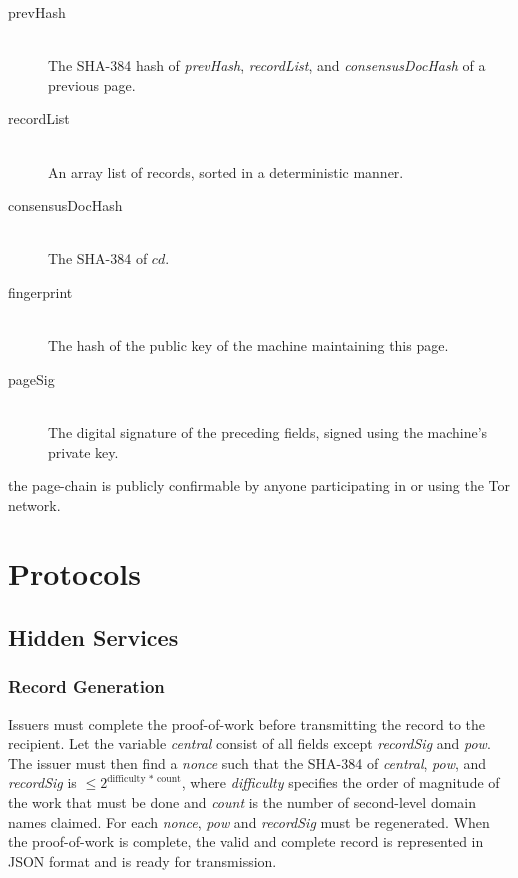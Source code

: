 \begin{description}
	\item[prevHash] \hfill \\
		The SHA-384 hash of \emph{prevHash}, \emph{recordList}, and \emph{consensusDocHash} of a previous page.
	\item[recordList] \hfill \\
		An array list of records, sorted in a deterministic manner.
	\item[consensusDocHash] \hfill \\
		The SHA-384 of $ cd $.
	\item[fingerprint] \hfill \\
		The hash of the public key of the machine maintaining this page.
	\item[pageSig] \hfill \\
		The digital signature of the preceding fields, signed using the machine's private key.
\end{description}

the page-chain is publicly confirmable by anyone participating in or using the Tor network.

\section{Protocols}
\label{sec:Protocols}

\subsection{Hidden Services}

\subsubsection{Record Generation}

Issuers must complete the proof-of-work before transmitting the record to the recipient. Let the variable \emph{central} consist of all fields except \emph{recordSig} and \emph{pow}. The issuer must then find a \emph{nonce} such that the SHA-384 of \emph{central}, \emph{pow}, and \emph{recordSig} is $ \leq 2^\textrm{difficulty * count} $, where \emph{difficulty} specifies the order of magnitude of the work that must be done and \emph{count} is the number of second-level domain names claimed. For each \emph{nonce}, \emph{pow} and \emph{recordSig} must be regenerated. When the proof-of-work is complete, the valid and complete record is represented in JSON format and is ready for transmission.

